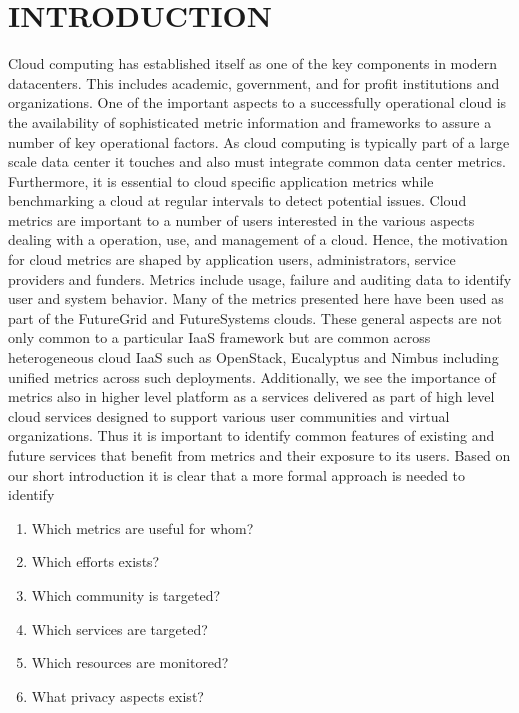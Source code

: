 \documentclass{sig-alternate-05-2015}
\begin{document}
\section{INTRODUCTION}

Cloud computing has established itself as one of the key components in
modern datacenters. This includes academic, government, and for profit
institutions and organizations. One of the important aspects to a
successfully operational cloud is the availability of sophisticated
metric information and frameworks to assure a number of key
operational factors. As cloud computing is typically part of a large
scale data center it touches and also must integrate common data
center metrics. Furthermore, it is essential to cloud specific
application metrics while benchmarking a cloud at regular intervals to
detect potential issues. Cloud metrics are important to a number of
users interested in the various aspects dealing with a operation, use,
and management of a cloud. Hence, the motivation for cloud metrics are
shaped by application users, administrators, service providers and
funders. Metrics include usage, failure and auditing data to identify
user and system behavior. Many of the metrics presented here have been
used as part of the FutureGrid and FutureSystems clouds. These general
aspects are not only common to a particular IaaS framework but are
common across heterogeneous cloud IaaS such as OpenStack, Eucalyptus
and Nimbus including unified metrics across such deployments.
Additionally, we see the importance of metrics also in higher level
platform as a services delivered as part of high level cloud services
designed to support various user communities and virtual
organizations. Thus it is important to identify common features of
existing and future services that benefit from metrics and their
exposure to its users. Based on our short introduction it is clear
that a more formal approach is needed to identify

\begin{enumerate}
\setlength\itemsep{-2pt}
\item Which metrics are useful for whom?
\item Which efforts exists?
\item Which community is targeted?
\item Which services are targeted?
\item Which resources are monitored?
\item What privacy aspects exist? 
\end{enumerate}
\end{document}
